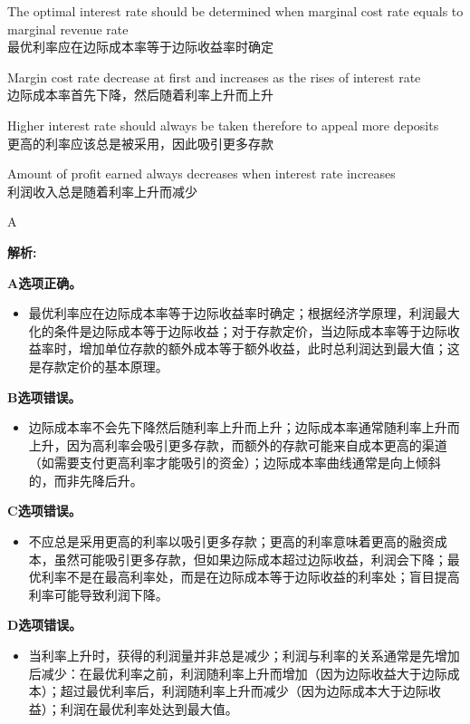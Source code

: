 \documentclass{article}
\newenvironment{explanation}
{\textbf{解析:}\par}
{\par}
\begin{document}
\begin{choices}
    \item The optimal interest rate should be determined when marginal cost rate equals to marginal revenue rate\\
    最优利率应在边际成本率等于边际收益率时确定
    \item Margin cost rate decrease at first and increases as the rises of interest rate\\
    边际成本率首先下降，然后随着利率上升而上升
    \item Higher interest rate should always be taken therefore to appeal more deposits\\
    更高的利率应该总是被采用，因此吸引更多存款
    \item Amount of profit earned always decreases when interest rate increases\\
    利润收入总是随着利率上升而减少
\end{choices}

\begin{correctanswer}
    A
\end{correctanswer}

\begin{explanation}
    \textbf{A选项正确。}
    \begin{itemize}
        \item 最优利率应在边际成本率等于边际收益率时确定；根据经济学原理，利润最大化的条件是边际成本等于边际收益；对于存款定价，当边际成本率等于边际收益率时，增加单位存款的额外成本等于额外收益，此时总利润达到最大值；这是存款定价的基本原理。
    \end{itemize}

    \textbf{B选项错误。}
    \begin{itemize}
        \item 边际成本率不会先下降然后随利率上升而上升；边际成本率通常随利率上升而上升，因为高利率会吸引更多存款，而额外的存款可能来自成本更高的渠道（如需要支付更高利率才能吸引的资金）；边际成本率曲线通常是向上倾斜的，而非先降后升。
    \end{itemize}

    \textbf{C选项错误。}
    \begin{itemize}
        \item 不应总是采用更高的利率以吸引更多存款；更高的利率意味着更高的融资成本，虽然可能吸引更多存款，但如果边际成本超过边际收益，利润会下降；最优利率不是在最高利率处，而是在边际成本等于边际收益的利率处；盲目提高利率可能导致利润下降。
    \end{itemize}

    \textbf{D选项错误。}
    \begin{itemize}
        \item 当利率上升时，获得的利润量并非总是减少；利润与利率的关系通常是先增加后减少：在最优利率之前，利润随利率上升而增加（因为边际收益大于边际成本）；超过最优利率后，利润随利率上升而减少（因为边际成本大于边际收益）；利润在最优利率处达到最大值。
    \end{itemize}
\end{explanation}
\end{document}
